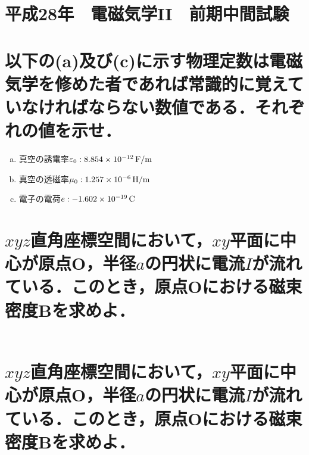 \documentclass[dvipdfmx]{ujarticle}
\begin{document}
\clearpage
\setcounter{section}{0}
\section*{平成28年　電磁気学II　前期中間試験}
\section{以下の(a)及び(c)に示す物理定数は電磁気学を修めた者であれば常識的に覚えていなければならない数値である．それぞれの値を示せ．}
\begin{enumerate}[(a)]
	\item 真空の誘電率$\varepsilon_{0}:8.854 \times 10^{-12}\,\rm{F/m}$
	\item 真空の透磁率$\mu_{0}:1.257 \times 10^{-6}\,\rm{H/m}$
	\item 電子の電荷$e:-1.602 \times 10^{-19}\,\rm{C}$
\end{enumerate}

\section{$xyz$直角座標空間において，$xy$平面に中心が原点O，半径$a$の円状に電流$I$が流れている．このとき，原点Oにおける磁束密度$\boldsymbol{B}$を求めよ．}
\begin{align*}
\end{align*}

\section{$xyz$直角座標空間において，$xy$平面に中心が原点O，半径$a$の円状に電流$I$が流れている．このとき，原点Oにおける磁束密度$\boldsymbol{B}$を求めよ．}
\begin{align*}
\end{align*}

\section{}
\begin{align*}
\end{align*}

\section{}
\begin{align*}
\end{align*}

\section{}
\begin{align*}
\end{align*}
\end{document}
